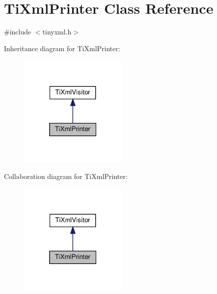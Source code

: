 \hypertarget{classTiXmlPrinter}{}\section{Ti\+Xml\+Printer Class Reference}
\label{classTiXmlPrinter}


{\ttfamily \#include $<$tinyxml.\+h$>$}



Inheritance diagram for Ti\+Xml\+Printer\+:
\nopagebreak
\begin{figure}[H]
\begin{center}
\leavevmode
\includegraphics[width=151pt]{classTiXmlPrinter__inherit__graph}
\end{center}
\end{figure}


Collaboration diagram for Ti\+Xml\+Printer\+:
\nopagebreak
\begin{figure}[H]
\begin{center}
\leavevmode
\includegraphics[width=151pt]{classTiXmlPrinter__coll__graph}
\end{center}
\end{figure}
